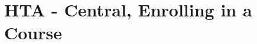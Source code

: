 \documentclass[10pt]{article}
\begin{document}
\section*{HTA - Central, Enrolling in a Course}
\begin{center}
\end{center}
\end{document}
